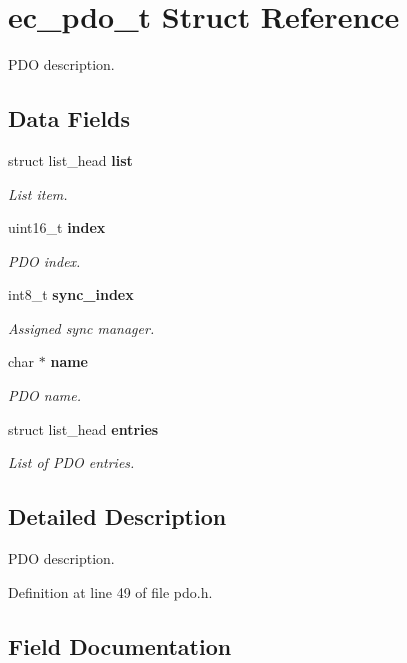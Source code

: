 \section{ec\-\_\-pdo\-\_\-t Struct Reference}
\label{structec__pdo__t}


P\-D\-O description.  


\subsection*{Data Fields}
\begin{DoxyCompactItemize}
\item 
struct list\-\_\-head {\bf list}
\begin{DoxyCompactList}\small\item\em List item. \end{DoxyCompactList}\item 
uint16\-\_\-t {\bf index}
\begin{DoxyCompactList}\small\item\em P\-D\-O index. \end{DoxyCompactList}\item 
int8\-\_\-t {\bf sync\-\_\-index}
\begin{DoxyCompactList}\small\item\em Assigned sync manager. \end{DoxyCompactList}\item 
char $\ast$ {\bf name}
\begin{DoxyCompactList}\small\item\em P\-D\-O name. \end{DoxyCompactList}\item 
struct list\-\_\-head {\bf entries}
\begin{DoxyCompactList}\small\item\em List of P\-D\-O entries. \end{DoxyCompactList}\end{DoxyCompactItemize}


\subsection{Detailed Description}
P\-D\-O description. 

Definition at line 49 of file pdo.\-h.



\subsection{Field Documentation}
